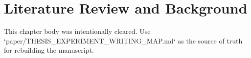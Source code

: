 \chapter{Literature Review and Background}
\label{ch:literature}

This chapter body was intentionally cleared. Use `paper/THESIS_EXPERIMENT_WRITING_MAP.md` as the source of truth for rebuilding the manuscript.
